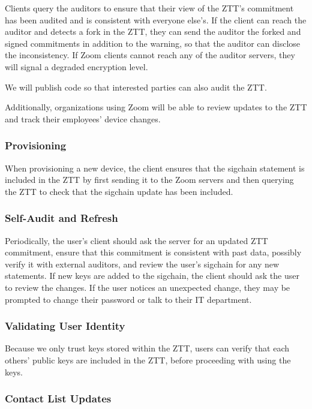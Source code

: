 Clients query the auditors to ensure that their view of the ZTT's commitment has been audited and is
consistent with everyone else's. If the client can reach the auditor and detects a fork in the ZTT,
they can send the auditor the forked and signed commitments in addition to the warning, so that the
auditor can disclose the inconsistency. If Zoom clients cannot reach any of the auditor servers,
they will signal a degraded encryption level.

We will publish code so that interested parties can also audit the ZTT.

Additionally, organizations using Zoom will be able to review updates to the ZTT and track their
employees' device changes.

\subsubsection{Provisioning}

When provisioning a new device, the client ensures that the sigchain statement is included in the
ZTT by first sending it to the Zoom servers and then querying the ZTT to check that the sigchain
update has been included.

\subsubsection{Self-Audit and Refresh}

Periodically, the user's client should ask the server for an updated ZTT commitment, ensure that
this commitment is consistent with past data, possibly verify it with external auditors, and review
the user's sigchain for any new statements. If new keys are added to the sigchain, the client should
ask the user to review the changes. If the user notices an unexpected change, they may be prompted
to change their password or talk to their IT department.

\subsubsection{Validating User Identity}

Because we only trust keys stored within the ZTT, users can verify that each others' public keys are
included in the ZTT, before proceeding with using the keys.

\subsubsection{Contact List Updates}

